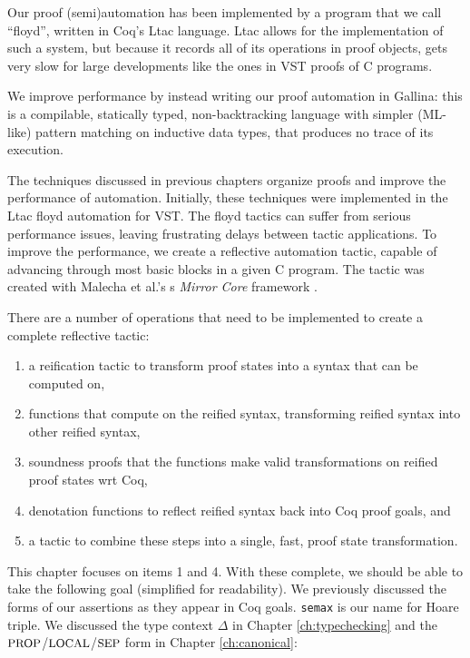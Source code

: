 \documentclass{puthesis}
\begin{document}
Our proof (semi)automation has been implemented by a program that we
call ``floyd'', written in Coq's Ltac language. Ltac allows for the
implementation of such a system, but because it records all of its
operations in proof objects, gets very slow for large developments
like the ones in VST proofs of C programs.

We improve performance by instead writing our proof automation in
Gallina: this is a compilable, statically typed, non-backtracking
language with simpler (ML-like) pattern matching on inductive data
types, that produces no trace of its execution.  

The techniques discussed in previous chapters organize proofs and
improve the performance of automation. Initially, these techniques
were implemented in the Ltac floyd automation for VST. The floyd
tactics can suffer from serious performance issues, leaving
frustrating delays between tactic applications. To improve the
performance, we create a reflective automation tactic, capable of
advancing through most basic blocks in a given C program.  The tactic
was created with Malecha et al.'s s \emph{Mirror Core} framework
\cite{malecha:thesis}.

There are a number of operations that need to be implemented to create
a complete reflective tactic: 
\begin{enumerate}
\item a reification tactic to transform proof states into a
  syntax that can be computed on,
\item functions that compute on the reified syntax, transforming
  reified syntax into other reified syntax,
\item soundness proofs that the functions make valid transformations
  on reified proof states wrt Coq,
\item denotation functions to reflect reified syntax back into Coq
  proof goals, and
\item a tactic to combine these steps into a single, fast, proof state
  transformation.
\end{enumerate}

This chapter focuses on items 1 and 4. With these complete, we should
be able to take the following goal (simplified for readability).  We
previously discussed the forms of our assertions as they appear in Coq
goals. \lstinline|semax| is our name for Hoare triple. We discussed
the type context $\Delta$ in Chapter \ref{ch:typechecking} and the
$\mbox{\small PROP}$/$\mbox{\small LOCAL}$/$\mbox{\small SEP}$ form in Chapter \ref{ch:canonical}:
\end{document}
